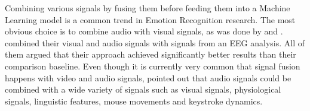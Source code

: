 \newline\newline
Combining various signals by fusing them before feeding them into a Machine Learning model is a common trend in Emotion Recognition research. The most obvious choice is to combine audio with visual signals, as was done by \citet{Yan:2016:MultiClueFusion} and \citet{Hossain:2019:AudioVisualER}. \citet{Xing:2019:EEGAudioVisual} combined their visual and audio signals with signals from an EEG analysis. All of them argued that their approach achieved significantly better results than their comparison baseline.\newline
Even though it is currently very common that signal fusion happens with video and audio signals, \citet{Akcay:2020:SpeechEmotionRecognition(SER)} pointed out that audio signals could be combined with a wide variety of signals such as visual signals, physiological signals, linguistic features, mouse movements and keystroke dynamics.



